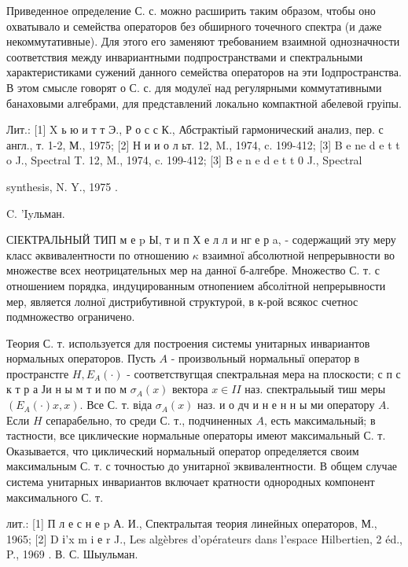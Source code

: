 \documentclass[10pt]{article}
\begin{document}
Приведенное определение С. с. можно расширить таким образом, чтобы оно охватывало и семейства операторов без обширного точечного спектра (и даже некоммутативные). Для этого его заменяют требованием взаимной однозначности соответствия между инвариантными подпространствами и спектральными характеристиками сужений данного семейства операторов на эти Іодпространства. В этом смысле говорят о С. с. для модулеї над регулярными коммутативными банаховыми алгебрами, для представлений локально компактной абелевой груіпы.



Лит.: [1] X ь ю и т т Э., Р о с с К., Абстрактіый гармонический анализ, пер. с англ., т. 1-2, М., 1975; [2] Н и и о л ьт. 12, M., 1974, c. 199-412; [3] B e ne d e t t o J., Spectral T. 12, M., 1974, c. 199-412; [3] B e n e d e t t 0 J., Spectral

synthesis, N. Y., 1975 .

C. 'Iyльман.



СІЕКТРАЛЬНЫЙ ТИП м е $\mathrm{p}$ Ы, т и п Х е л л и нг е р a, - содержащий эту меру класс әквивалентности по отношению $\kappa$ взаимної абсолютной непрерывности во множестве всех неотрицательных мер на данної б-алгебре. Множество С. т. с отношением порядка, индуцированным отнопением абсолітной непрерывности мер, является лолної дистрибутивной структуроӥ, в к-рой всякос счетнос подмножество ограничено.



Теория С. т. используется для построения системы унитарных инвариантов нормальных операторов. Пусть $A$ - произвольный нормальныї оператор в пространстге $H, E_{A}(\cdot)$ - соответствугщая спектральная мера на плоскости; с п с к т р а Ји н ы м т и по м $\sigma_{A}(x)$ вектора $x \in I I$ наз. спектральыый тиш меры $\left(E_{A}(\cdot) x, x\right)$. Все С. т. віда $\sigma_{A}(x)$ наз. и о дч и н е н н ы ми оператору $A$. Если $H$ сепарабельно, то среди С. т., подчиненных $A$, есть максимальный; в тастности, все циклические нормальные операторы имеют максимальный С. т. Оказывается, что циклический нормальный оператор определяется своим максимальным С. т. с точностью до унитарної эквивалентности. В общем случае система унитарных инвариантов включает кратности однородных компонент максимального С. т.



лит.: [1] П л е с н е p А. И., Спектралытая теория линейных операторов, М., 1965; [2] D і'x m i е r J., Les algèbres d'opérateurs dans l'espace Hilbertien, 2 éd., P., 1969 . В. С. Шыульман.
\end{document}
